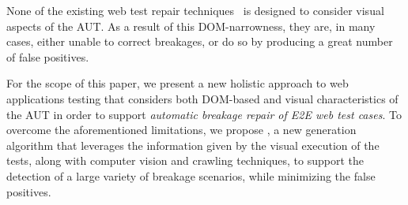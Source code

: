 
None of the existing web test repair techniques~\cite{Choudhary:2011:WWA:2002931.2002935,Hammoudi-2016-FSE,2015-leotta-ICST} is designed to consider visual aspects of the AUT. As a result of this DOM-narrowness, they are, in many cases, either unable to correct breakages, or do so by producing a great number of false positives. 


For the scope of this paper, we present a new holistic approach to  web applications testing that considers both DOM-based and visual characteristics of the AUT in order to support \textit{automatic breakage repair of E2E web test cases}. 
To overcome the aforementioned limitations, we propose \tool, a new generation algorithm that leverages the information given by the visual execution of the tests, along with computer vision and crawling techniques, to support the detection of a large variety of breakage scenarios, while minimizing the false positives. 

